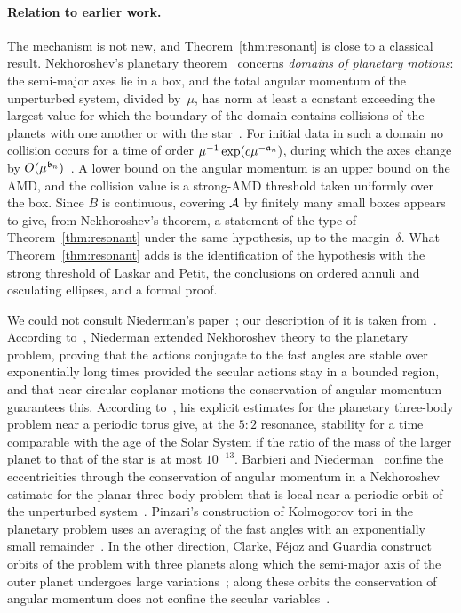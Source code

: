 \paragraph{Relation to earlier work.} The mechanism is not new, and Theorem~\ref{thm:resonant} is close to a classical result. Nekhoroshev's planetary theorem~\cite[\S12, Theorem~12.3]{Nek77} concerns \emph{domains of planetary motions}: the semi-major axes lie in a box, and the total angular momentum of the unperturbed system, divided by~$\mu$, has norm at least a constant exceeding the largest value for which the boundary of the domain contains collisions of the planets with one another or with the star~\cite[\S12.2, p.~55]{Nek77}. For initial data in such a domain no collision occurs for a time of order $\mu^{-1}\exp(c\mu^{-\mathfrak{a}_n{}})$, during which the axes change by $O(\mu^{\mathfrak{b}_n{}})$~\cite[(12.3)--(12.5)]{Nek77}. A lower bound on the angular momentum is an upper bound on the AMD, and the collision value is a strong-AMD threshold taken uniformly over the box. Since $B$ is continuous, covering $\mathcal{A}$ by finitely many small boxes appears to give, from Nekhoroshev's theorem, a statement of the type of Theorem~\ref{thm:resonant} under the same hypothesis, up to the margin~$\delta$. What Theorem~\ref{thm:resonant} adds is the identification of the hypothesis with the strong threshold of Laskar and Petit, the conclusions on ordered annuli and osculating ellipses, and a formal proof.

We could not consult Niederman's paper~\cite{Nie96}; our description of it is taken from~\cite{CFG24,BN20}. According to~\cite[\S1.3]{CFG24}, Niederman extended Nekhoroshev theory to the planetary problem, proving that the actions conjugate to the fast angles are stable over exponentially long times provided the secular actions stay in a bounded region, and that near circular coplanar motions the conservation of angular momentum guarantees this. According to~\cite[p.~2]{BN20}, his explicit estimates for the planetary three-body problem near a periodic torus give, at the $5{:}2$ resonance, stability for a time comparable with the age of the Solar System if the ratio of the mass of the larger planet to that of the star is at most $10^{-13}$. Barbieri and Niederman~\cite[\S3.3.2, Theorem~7]{BN20} confine the eccentricities through the conservation of angular momentum in a Nekhoroshev estimate for the planar three-body problem that is local near a periodic orbit of the unperturbed system~\cite[\S3.3.3]{BN20}. Pinzari's construction of Kolmogorov tori in the planetary problem uses an averaging of the fast angles with an exponentially small remainder~\cite[Proposition~5.1]{Pin18}. In the other direction, Clarke, F\'ejoz and Guardia construct orbits of the problem with three planets along which the semi-major axis of the outer planet undergoes large variations~\cite[Theorem~1]{CFG24}; along these orbits the conservation of angular momentum does not confine the secular variables~\cite[\S1.3]{CFG24}.


